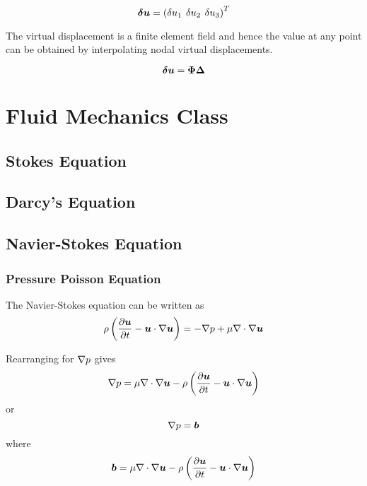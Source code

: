 \begin{equation}
  \vect{\delta u}=\transpose{\pbrac{\delta u_{1} \hspace{4 pt} \delta u_{2} \hspace{4 pt} \delta u_{3}}}
  \label{eqn:displacementvector}
\end{equation}

The virtual displacement is a finite element field and hence the value at any point can be obtained by interpolating nodal 
virtual displacements.

\begin{equation}
  \vect{\delta u}=\matr{\Phi}\matr{\Delta}
  \label{eqn:interpolation}
\end{equation}



\section{Fluid Mechanics Class}

\subsection{Stokes Equation}

\subsection{Darcy's Equation}

\subsection{Navier-Stokes Equation}

\subsubsection{Pressure Poisson Equation}

The Navier-Stokes equation can be written as
\begin{equation}
  \rho\pbrac{\delby{\vect{u}}{t}-\dotprod{\vect{u}}{\gradient{\vect{u}}}}=-\grad{p}+\mu\diverg{\gradient{\vect{u}}}
  \label{eqn:NavierStokes}
\end{equation}

Rearranging for $\nabla{p}$ gives
\begin{equation}
  \grad{p}=\mu\diverg{\gradient{\vect{u}}}-\rho\pbrac{\delby{\vect{u}}{t}-\dotprod{\vect{u}}{\gradient{\vect{u}}}}  
\end{equation}
or
\begin{equation}
  \gradient{p}=\vect{b}
  \label{eqn:NavierStokesPressureForm}
\end{equation}
where
\begin{equation}
  \vect{b}=\mu\diverg{\gradient{\vect{u}}}-\rho\pbrac{\delby{\vect{u}}{t}-\dotprod{\vect{u}}{\gradient{\vect{u}}}}
\end{equation}


